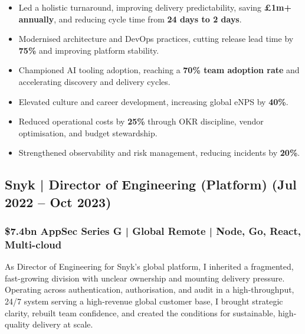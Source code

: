 \documentclass[12pt]{article}
\begin{document}
\begin{itemize}
  \item Led a holistic turnaround, improving delivery predictability, saving \textbf{\pounds1m+ annually}, and reducing cycle time from \textbf{24 days to 2 days}.
  \item Modernised architecture and DevOps practices, cutting release lead time by \textbf{75\%} and improving platform stability.
  \item Championed AI tooling adoption, reaching a \textbf{70\% team adoption rate} and accelerating discovery and delivery cycles.
  \item Elevated culture and career development, increasing global eNPS by \textbf{40\%}.
  \item Reduced operational costs by \textbf{25\%} through OKR discipline, vendor optimisation, and budget stewardship.
  \item Strengthened observability and risk management, reducing incidents by \textbf{20\%}.
\end{itemize}

\subsection*{Snyk | Director of Engineering (Platform) \small (Jul 2022 -- Oct 2023)}
\subsubsection*{\$7.4bn AppSec Series G | Global Remote | Node, Go, React, Multi-cloud}

As Director of Engineering for Snyk's global platform, I inherited a fragmented, fast-growing division with unclear ownership and mounting delivery pressure. Operating across authentication, authorisation, and audit in a high-throughput, 24/7 system serving a high-revenue global customer base, I brought strategic clarity, rebuilt team confidence, and created the conditions for sustainable, high-quality delivery at scale.
\end{document}
